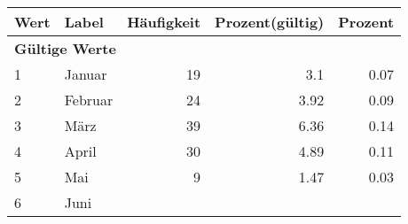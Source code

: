      \begin{longtable}{lXrrr}
     \toprule
     \textbf{Wert} & \textbf{Label} & \textbf{Häufigkeit} & \textbf{Prozent(gültig)} & \textbf{Prozent} \\
     \endhead
     \midrule
     \multicolumn{5}{l}{\textbf{Gültige Werte}}\\

     1 &
     \multicolumn{1}{X}{ Januar   } &


       \num{19} &
       \num[round-mode=places,round-precision=2]{3.1} &
         \num[round-mode=places,round-precision=2]{0.07} \\

     2 &
     \multicolumn{1}{X}{ Februar   } &


       \num{24} &
       \num[round-mode=places,round-precision=2]{3.92} &
         \num[round-mode=places,round-precision=2]{0.09} \\

     3 &
     \multicolumn{1}{X}{ März   } &


       \num{39} &
       \num[round-mode=places,round-precision=2]{6.36} &
         \num[round-mode=places,round-precision=2]{0.14} \\

     4 &
     \multicolumn{1}{X}{ April   } &


       \num{30} &
       \num[round-mode=places,round-precision=2]{4.89} &
         \num[round-mode=places,round-precision=2]{0.11} \\

     5 &
     \multicolumn{1}{X}{ Mai   } &


       \num{9} &
       \num[round-mode=places,round-precision=2]{1.47} &
         \num[round-mode=places,round-precision=2]{0.03} \\

     6 &
     \multicolumn{1}{X}{ Juni   } &



\end{longtable}
